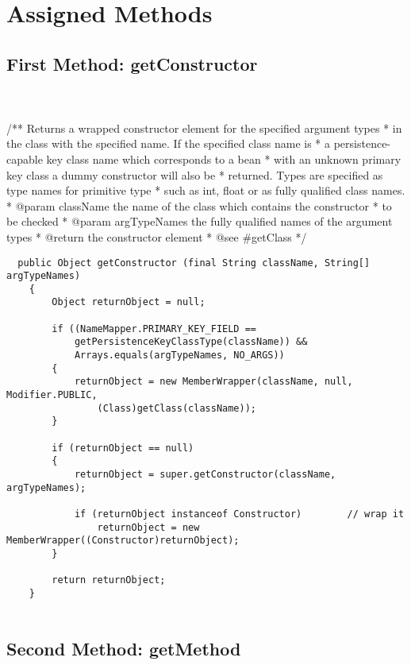 \section{Assigned Methods}
\subsection{First Method: getConstructor} \\ \\

	/** Returns a wrapped constructor element for the specified argument types 
	 * in the class with the specified name.  If the specified class name is 
	 * a persistence-capable key class name which corresponds to a bean 
	 * with an unknown primary key class a dummy constructor will also be 
	 * returned.  Types are specified as type names for primitive type 
	 * such as int, float or as fully qualified class names.
	 * @param className the name of the class which contains the constructor 
	 * to be checked
	 * @param argTypeNames the fully qualified names of the argument types
	 * @return the constructor element
	 * @see #getClass
	 */
	 
\begin{lstlisting}	public Object getConstructor (final String className, String[] argTypeNames)
	{
		Object returnObject = null;

		if ((NameMapper.PRIMARY_KEY_FIELD == 
			getPersistenceKeyClassType(className)) && 
			Arrays.equals(argTypeNames, NO_ARGS))
		{
			returnObject = new MemberWrapper(className, null, Modifier.PUBLIC, 
				(Class)getClass(className));
		}

		if (returnObject == null)
		{
			returnObject = super.getConstructor(className, argTypeNames);

			if (returnObject instanceof Constructor)		// wrap it
				returnObject = new MemberWrapper((Constructor)returnObject);
		}

		return returnObject;
	}
	
\end{lstlisting}
	
	
\newpage
\subsection{Second Method: getMethod} \\ \\


